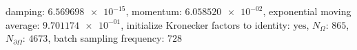 damping: $\num[scientific-notation=true]{6.569698e-15}$, momentum: $\num[scientific-notation=true]{6.058520e-02}$, exponential moving average: $\num[scientific-notation=true]{9.701174e-01}$, initialize Kronecker factors to identity: $\text{yes}$, $N_{\Omega}$: $\num[scientific-notation=false]{865}$, $N_{\partial\Omega}$: $\num[scientific-notation=false]{4673}$, batch sampling frequency: $\num[scientific-notation=false]{728}$